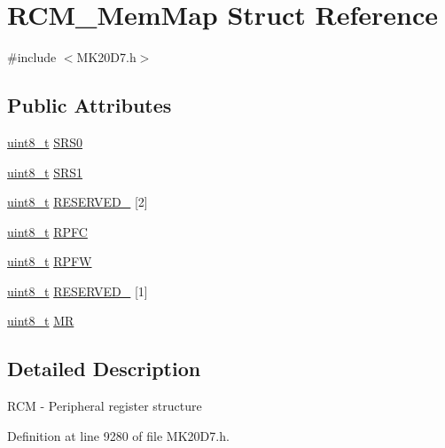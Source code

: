 \hypertarget{struct_r_c_m___mem_map}{}\section{R\+C\+M\+\_\+\+Mem\+Map Struct Reference}
\label{struct_r_c_m___mem_map}


{\ttfamily \#include $<$M\+K20\+D7.\+h$>$}

\subsection*{Public Attributes}
\begin{DoxyCompactItemize}
\item 
\hyperlink{_p_e___types_8h_aba7bc1797add20fe3efdf37ced1182c5}{uint8\+\_\+t} \hyperlink{struct_r_c_m___mem_map_aa28b91bdb2e1acc454f7bcb9ad26efb7}{S\+R\+S0}
\item 
\hyperlink{_p_e___types_8h_aba7bc1797add20fe3efdf37ced1182c5}{uint8\+\_\+t} \hyperlink{struct_r_c_m___mem_map_a8e7926e6f51e64e63e5ed3adb7aee612}{S\+R\+S1}
\item 
\hyperlink{_p_e___types_8h_aba7bc1797add20fe3efdf37ced1182c5}{uint8\+\_\+t} \hyperlink{struct_r_c_m___mem_map_a49b7ea98d314c63638551ad99a064795}{R\+E\+S\+E\+R\+V\+E\+D\+\_} \mbox{[}2\mbox{]}
\item 
\hyperlink{_p_e___types_8h_aba7bc1797add20fe3efdf37ced1182c5}{uint8\+\_\+t} \hyperlink{struct_r_c_m___mem_map_ace89c039f8342f8b5dd26c3c7b8309a2}{R\+P\+FC}
\item 
\hyperlink{_p_e___types_8h_aba7bc1797add20fe3efdf37ced1182c5}{uint8\+\_\+t} \hyperlink{struct_r_c_m___mem_map_ac458f95f6aa234285f568694a5b8240d}{R\+P\+FW}
\item 
\hyperlink{_p_e___types_8h_aba7bc1797add20fe3efdf37ced1182c5}{uint8\+\_\+t} \hyperlink{struct_r_c_m___mem_map_a75dc1933a3575850aa055bb71f094323}{R\+E\+S\+E\+R\+V\+E\+D\+\_} \mbox{[}1\mbox{]}
\item 
\hyperlink{_p_e___types_8h_aba7bc1797add20fe3efdf37ced1182c5}{uint8\+\_\+t} \hyperlink{struct_r_c_m___mem_map_a0e7b707ffc94ef2a3c49a5ca51acc6c9}{MR}
\end{DoxyCompactItemize}


\subsection{Detailed Description}
R\+CM -\/ Peripheral register structure 

Definition at line 9280 of file M\+K20\+D7.\+h.



